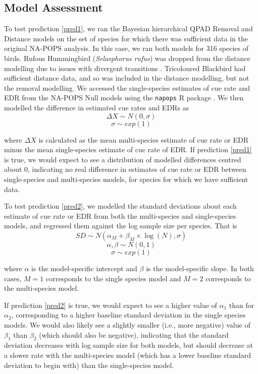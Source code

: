 \documentclass[12pt]{article}
\begin{document}
\subsection{Model Assessment}

\par To test prediction \ref{pred1}, we ran the Bayesian hierarchical QPAD Removal and Distance models on the set of species for which there was sufficient data in the original NA-POPS analysis.
In this case, we ran both models for 316 species of birds.
Rufous Hummingbird (\textit{Selasphorus rufus}) was dropped from the distance modelling due to issues with divergent transitions \citep{betancourt_diagnosing_2016, leimkuhler_simulating_2005}.
Tricoloured Blackbird had sufficient distance data, and so was included in the distance modelling, but not the removal modelling.
We accessed the single-species estimates of cue rate and EDR from the NA-POPS Null models using the \texttt{napops} R package \citep{edwards_napops_2023, edwards_point_2023}.
We then modelled the difference in estimated cue rates and EDRs as
$$\Delta X \sim N(0,\sigma)$$
$$\sigma \sim exp(1)$$

where $\Delta X$ is calculated as the mean multi-species estimate of cue rate or EDR minus the mean single-species estimate of cue rate of EDR.
If prediction \ref{pred1} is true, we would expect to see a distribution of modelled differences centred about 0, indicating no real difference in estimates of cue rate or EDR between single-species and multi-species models, for species for which we have sufficient data.

\par To test prediction \ref{pred2}, we modelled the standard deviations about each estimate of cue rate or EDR from both the multi-species and single-species models, and regressed them against the log sample size per species.
That is
$$SD \sim N(\alpha_M + \beta_M\times \log(N), \sigma)$$
$$\alpha, \beta \sim N(0,1)$$
$$\sigma \sim exp(1)$$

where $\alpha$ is the model-specific intercept and $\beta$ is the model-specific slope.
In both cases, $M=1$ corresponds to the single species model and $M=2$ corresponds to the multi-species model.

\par If prediction \ref{pred2} is true, we would expect to see a higher value of $\alpha_1$ than for $\alpha_2$, corresponding to a higher baseline standard deviation in the single species models.
We would also likely see a slightly smaller (i.e., more negative) value of $\beta_1$ than $\beta_2$ (which should also be negative), indicating that the standard deviation decreases with log sample size for both models, but should decrease at a slower rate with the multi-species model (which has a lower baseline standard deviation to begin with) than the single-species model.
\end{document}
